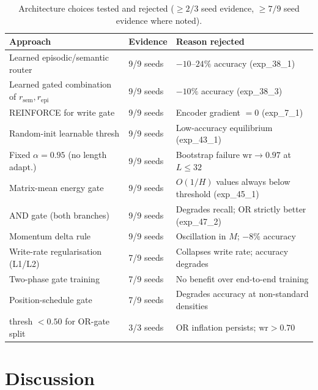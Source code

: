 \documentclass{article}
\begin{document}
\begin{table}[h]
  \centering
  \small
  \caption{Architecture choices tested and rejected ($\geq\!2/3$ seed evidence,
    $\geq\!7/9$ seed evidence where noted).}
  \label{tab:dead-ends}
  \begin{tabular}{p{5.2cm}p{2.5cm}p{4.5cm}}
    \toprule
    \textbf{Approach} & \textbf{Evidence} & \textbf{Reason rejected} \\
    \midrule
    Learned episodic/semantic router & 9/9 seeds & $-10$--$24\%$ accuracy (exp\_38\_1) \\
    Learned gated combination of $r_\mathrm{sem}, r_\mathrm{epi}$ & 9/9 seeds & $-10\%$ accuracy (exp\_38\_3) \\
    REINFORCE for write gate & 9/9 seeds & Encoder gradient $= 0$ (exp\_7\_1) \\
    Random-init learnable thresh & 9/9 seeds & Low-accuracy equilibrium (exp\_43\_1) \\
    Fixed $\alpha=0.95$ (no length adapt.) & 9/9 seeds & Bootstrap failure $\mathrm{wr}\to0.97$ at $L\leq32$ \\
    Matrix-mean energy gate & 9/9 seeds & $O(1/H)$ values always below threshold (exp\_45\_1) \\
    AND gate (both branches) & 9/9 seeds & Degrades recall; OR strictly better (exp\_47\_2) \\
    Momentum delta rule & 9/9 seeds & Oscillation in $M$; $-8\%$ accuracy \\
    Write-rate regularisation (L1/L2) & 7/9 seeds & Collapses write rate; accuracy degrades \\
    Two-phase gate training & 7/9 seeds & No benefit over end-to-end training \\
    Position-schedule gate & 7/9 seeds & Degrades accuracy at non-standard densities \\
    thresh $< 0.50$ for OR-gate split & 3/3 seeds & OR inflation persists; $\mathrm{wr}>0.70$ \\
    \bottomrule
  \end{tabular}
\end{table}

\section{Discussion}
\label{sec:discussion}
\end{document}
